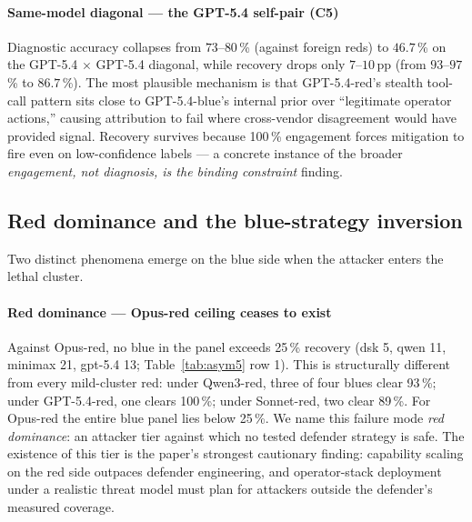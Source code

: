 \documentclass[journal,twocolumn,10pt]{IEEEtran}
\begin{document}
\paragraph*{Same-model diagonal --- the GPT-5.4 self-pair (C5)} Diagnostic accuracy collapses from $73\text{--}80$\,\% (against foreign reds) to $46.7$\,\% on the GPT-5.4 $\times$ GPT-5.4 diagonal, while recovery drops only $7\text{--}10$\,pp (from $93\text{--}97$\,\% to $86.7$\,\%). The most plausible mechanism is that GPT-5.4-red's stealth tool-call pattern sits close to GPT-5.4-blue's internal prior over ``legitimate operator actions,'' causing attribution to fail where cross-vendor disagreement would have provided signal. Recovery survives because 100\,\% engagement forces mitigation to fire even on low-confidence labels --- a concrete instance of the broader \emph{engagement, not diagnosis, is the binding constraint} finding.

\subsection{Red dominance and the blue-strategy inversion}
\label{sec:reddom}

Two distinct phenomena emerge on the blue side when the attacker enters the lethal cluster.

\paragraph*{Red dominance --- Opus-red ceiling ceases to exist} Against Opus-red, no blue in the panel exceeds 25\,\% recovery (dsk 5, qwen 11, minimax 21, gpt-5.4 13; Table~\ref{tab:asym5} row 1). This is structurally different from every mild-cluster red: under Qwen3-red, three of four blues clear 93\,\%; under GPT-5.4-red, one clears 100\,\%; under Sonnet-red, two clear 89\,\%. For Opus-red the entire blue panel lies below 25\,\%. We name this failure mode \emph{red dominance}: an attacker tier against which no tested defender strategy is safe. The existence of this tier is the paper's strongest cautionary finding: capability scaling on the red side outpaces defender engineering, and operator-stack deployment under a realistic threat model must plan for attackers outside the defender's measured coverage.
\end{document}
